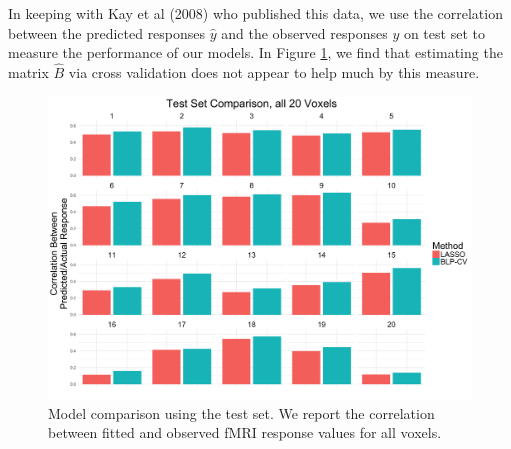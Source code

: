 \documentclass[main]{subfiles}
\begin{document}
In keeping with Kay et al (2008) who published this data, we use the correlation between the predicted responses $\widehat{y}$  and the observed responses $y$ on test set to measure the performance of our models. In Figure \ref{fig-cor}, we find that estimating the matrix $\widehat{B}$ via cross validation does not appear to help much by this measure.

\begin{figure}[h!]
\centering
\includegraphics[width = 14cm]{../fmri_study/plots/cors.png}
\caption{Model comparison using the test set. We report the correlation between fitted and observed fMRI response values for all voxels.}
\label{fig-cor}
\end{figure}
\end{document}
